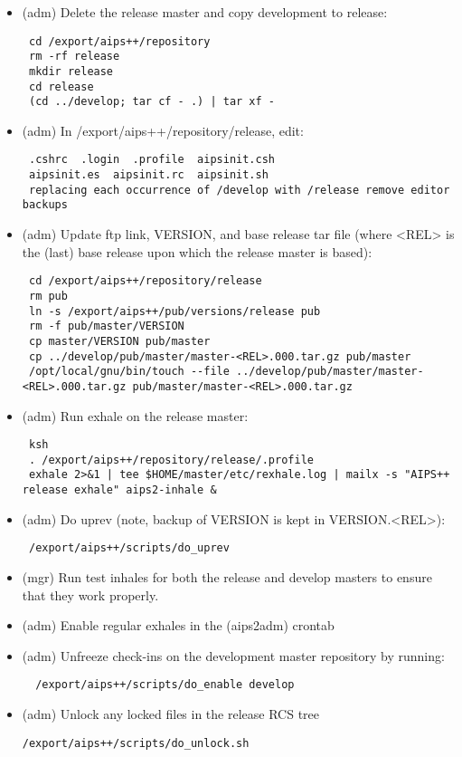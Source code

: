\begin{itemize}
\item (adm) Delete the release master and copy development to release:
\begin{verbatim}
 cd /export/aips++/repository
 rm -rf release
 mkdir release
 cd release
 (cd ../develop; tar cf - .) | tar xf -
\end{verbatim}

\item (adm) In /export/aips++/repository/release, edit:
\begin{verbatim}										
 .cshrc  .login  .profile  aipsinit.csh
 aipsinit.es  aipsinit.rc  aipsinit.sh
 replacing each occurrence of /develop with /release remove editor backups
\end{verbatim}
												
\item (adm) Update ftp link, VERSION, and base release tar file (where <REL> is the (last) base
release upon which the release master is based):
\begin{verbatim}
 cd /export/aips++/repository/release
 rm pub
 ln -s /export/aips++/pub/versions/release pub
 rm -f pub/master/VERSION
 cp master/VERSION pub/master
 cp ../develop/pub/master/master-<REL>.000.tar.gz pub/master
 /opt/local/gnu/bin/touch --file ../develop/pub/master/master-<REL>.000.tar.gz pub/master/master-<REL>.000.tar.gz
\end{verbatim}
\item (adm) Run exhale on the release master:
\begin{verbatim}
 ksh
 . /export/aips++/repository/release/.profile
 exhale 2>&1 | tee $HOME/master/etc/rexhale.log | mailx -s "AIPS++ release exhale" aips2-inhale &
\end{verbatim}

\item(adm) Do uprev (note, backup of VERSION is kept in VERSION.<REL>):
\begin{verbatim}										
 /export/aips++/scripts/do_uprev
\end{verbatim}
\item (mgr) Run test inhales for both the release and develop masters to ensure
that they work properly.
\item (adm) Enable regular exhales in the (aips2adm) crontab
\item (adm) Unfreeze check-ins on the development master repository by running:
\begin{verbatim}
  /export/aips++/scripts/do_enable develop
\end{verbatim}
\item (adm) Unlock any locked files in the release RCS tree
\begin{verbatim}
/export/aips++/scripts/do_unlock.sh
\end{verbatim}
\end{itemize}

